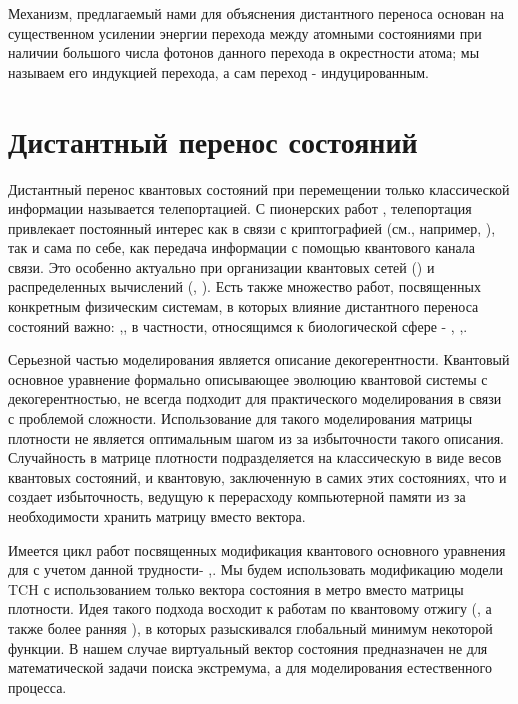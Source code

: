 \documentclass[12pt]{article}
\begin{document}
Механизм, предлагаемый нами для объяснения дистантного переноса основан на существенном усилении энергии перехода между атомными состояниями при наличии большого числа фотонов данного перехода в окрестности атома; мы называем его индукцией перехода, а сам переход - индуцированным.

\section{Дистантный перенос состояний}

	Дистантный перенос квантовых состояний при перемещении только классической информации называется телепортацией. С пионерских работ \cite{Tel0},\cite{Tel} телепортация привлекает постоянный интерес как в связи с криптографией (см., например, \cite{Tel1}), так и сама по себе, как передача информации с помощью квантового канала связи. Это особенно актуально при организации квантовых сетей (\cite{netw}) и распределенных вычислений (\cite{gates}, \cite{transfer}). Есть также множество работ, посвященных конкретным физическим системам, в которых влияние дистантного переноса состояний важно: \cite{water},\cite{mont}, в частности, относящимся к биологической сфере - \cite{dna}, \cite{decoh},\cite{recogn}.

 Серьезной частью моделирования является описание декогерентности. Квантовый основное уравнение формально описывающее эволюцию квантовой системы с декогерентностью, не всегда подходит для практического моделирования в связи с проблемой сложности. Использование для такого моделирования матрицы плотности не является оптимальным шагом из за избыточности такого описания. Случайность в матрице плотности подразделяется на классическую в виде весов квантовых состояний, и квантовую, заключенную в самих этих состояниях, что и создает избыточность, ведущую к перерасходу компьютерной памяти из за необходимости хранить матрицу вместо вектора. 

Имеется цикл работ посвященных модификация квантового основного уравнения для с учетом данной трудности- \cite{qcl},\cite{lindbl}. Мы будем использовать модификацию модели TCH с использованием только вектора состояния в метро вместо матрицы плотности.
 Идея такого подхода восходит к работам по квантовому отжигу (\cite{1}, а также более ранняя \cite{2}), в которых разыскивался глобальный минимум некоторой функции. В нашем случае виртуальный вектор состояния предназначен не для математической задачи поиска экстремума, а для моделирования естественного процесса.
\end{document}
